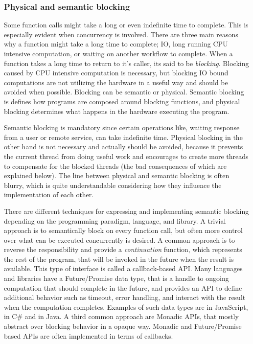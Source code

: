 \subsubsection{Physical and semantic blocking}
Some function calls might take a long or even indefinite time to complete. This is especially evident when concurrency is involved. There are three main reasons why a function might take a long time to complete; IO, long running CPU intensive computation, or waiting on another workflow to complete. When a function takes a long time to return to it's caller, its said to be \textit{blocking}. Blocking caused by CPU intensive computation is necessary, but blocking IO bound computations are not utilizing the hardware in a useful way and should be avoided when possible. Blocking can be semantic or physical. Semantic blocking is defines how programs are composed around blocking functions, and physical blocking determines what happens in the hardware executing the program.

Semantic blocking is mandatory since certain operations like, waiting response from a user or remote service, can take indefinite time. Physical blocking in the other hand is not necessary and actually should be avoided, because it prevents the current thread from doing useful work and encourages to create more threads to compensate for the blocked threads (the bad consequences of which are explained below). The line between physical and semantic blocking is often blurry, which is quite understandable considering how they influence the implementation of each other.

There are different techniques for expressing and implementing semantic blocking depending on the programming paradigm, language, and library. A trivial approach is to semantically block on every function call, but often more control over what can be executed concurrently is desired. A common approach is to reverse the responsibility and provide a \textit{continuation} function, which represents the rest of the program, that will be invoked in the future when the result is available. This type of interface is called a callback-based API. Many languages and libraries have a Future/Promise data type, that is a handle to ongoing computation that should complete in the future, and provides an API to define additional behavior such as timeout, error handling, and interact with the result when the computation completes. Examples of such data types are  in JavaScript,  in C\# and  in Java. A third common approach are Monadic APIs, that mostly abstract over blocking behavior in a opaque way. Monadic and Future/Promise based APIs are often implemented in terms of callbacks.

